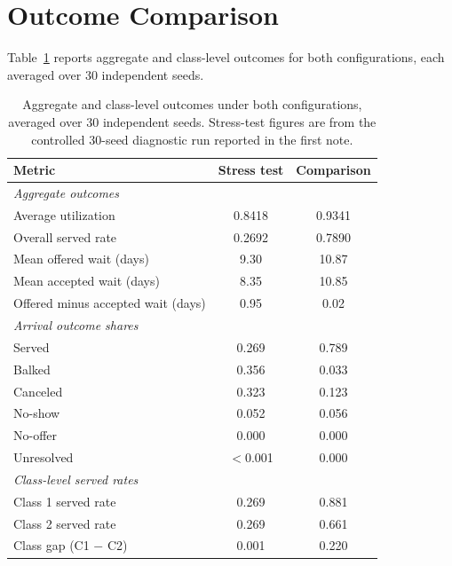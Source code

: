 \documentclass[11pt]{article}
\begin{document}
\section{Outcome Comparison}

Table~\ref{tab:outcomes} reports aggregate and class-level outcomes for both
configurations, each averaged over 30 independent seeds.

\begin{table}[h]
\centering
\renewcommand{\arraystretch}{1.18}
\small
\begin{tabular}{lcc}
\toprule
Metric & Stress test & Comparison \\
\midrule
\multicolumn{3}{l}{\textit{Aggregate outcomes}} \\
Average utilization & 0.8418 & 0.9341 \\
Overall served rate & 0.2692 & 0.7890 \\
Mean offered wait (days) & 9.30 & 10.87 \\
Mean accepted wait (days) & 8.35 & 10.85 \\
Offered minus accepted wait (days) & 0.95 & 0.02 \\
\midrule
\multicolumn{3}{l}{\textit{Arrival outcome shares}} \\
Served & 0.269 & 0.789 \\
Balked & 0.356 & 0.033 \\
Canceled & 0.323 & 0.123 \\
No-show & 0.052 & 0.056 \\
No-offer & 0.000 & 0.000 \\
Unresolved & $<$0.001 & 0.000 \\
\midrule
\multicolumn{3}{l}{\textit{Class-level served rates}} \\
Class 1 served rate & 0.269 & 0.881 \\
Class 2 served rate & 0.269 & 0.661 \\
Class gap (C1 $-$ C2) & 0.001 & 0.220 \\
\bottomrule
\end{tabular}
\caption{Aggregate and class-level outcomes under both configurations,
averaged over 30 independent seeds. Stress-test figures are from the
controlled 30-seed diagnostic run reported in the first note.}
\label{tab:outcomes}
\end{table}

\end{document}
